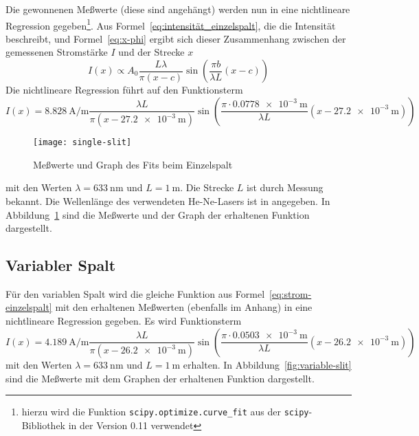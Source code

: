 Die gewonnenen Meßwerte (diese sind angehängt) werden nun in eine
nichtlineare Regression gegeben\footnote{hierzu wird die Funktion
  \texttt{scipy.optimize.curve\_fit} aus der \texttt{scipy}-Bibliothek
  in der Version 0.11 verwendet}. Aus
Formel~\eqref{eq:intensität_einzelspalt}, die die Intensität beschreibt,
und Formel~\eqref{eq:x-phi} ergibt sich dieser Zusammenhang zwischen der
gemessenen Stromstärke $I$ und der Strecke $x$
%
\begin{equation}
  \label{eq:strom-einzelspalt}
  I(x) \propto A_0\frac{L\lambda}{\pi(x-c)} \sin\left(\frac{\pi b}{\lambda
        L} (x-c)\right)
\end{equation}
%
Die nichtlineare Regression führt auf den Funktionsterm
%
\begin{equation}
  \label{eq:single-slit-fit}
  I(x) = \SI{8.828}{\ampere\per\metre}
  \frac{\lambda L}{\pi(x-\SI{27.2e-3}{\metre})}
  \sin\left(\frac{\pi\cdot\SI{0.0778e-3}{\metre}}{\lambda L} 
    (x-\SI{27.2e-3}{\metre})\right)
\end{equation}
%
\begin{figure}
  \centering
  \texttt{[image: single-slit]}
  \caption{Meßwerte und Graph des Fits beim Einzelspalt}
  \label{fig:single-slit}
\end{figure}
%
mit den Werten $\lambda = \SI{633}{\nano\metre}$ und $L =
\SI{1}{\metre}$. Die Strecke $L$ ist durch Messung bekannt. Die
Wellenlänge des verwendeten He-Ne-Lasers ist in \textcite[36]{v406}
angegeben. In Abbildung~\ref{fig:single-slit} sind die Meßwerte und der
Graph der erhaltenen Funktion dargestellt.


\subsection{Variabler Spalt}

Für den variablen Spalt wird die gleiche Funktion aus
Formel~\eqref{eq:strom-einzelspalt} mit den erhaltenen Meßwerten
(ebenfalls im Anhang) in eine nichtlineare Regression gegeben. Es
wird Funktionsterm
%
\begin{equation}
  \label{eq:variable-slit-fit}
  I(x) = \SI{4.189}{\ampere\per\metre}
  \frac{\lambda L}{\pi(x-\SI{26.2e-3}{\metre})}
  \sin\left(\frac{\pi\cdot\SI{0.0503e-3}{\metre}}{\lambda L} 
    (x-\SI{26.2e-3}{\metre})\right)
\end{equation}
%
mit den Werten $\lambda = \SI{633}{\nano\metre}$ und $L =
\SI{1}{\metre}$ erhalten.  In Abbildung~\ref{fig:variable-slit} sind die
Meßwerte mit dem Graphen der erhaltenen Funktion dargestellt.

